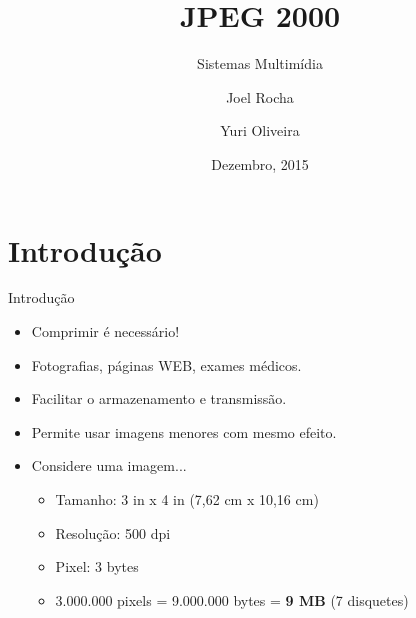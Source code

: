 \documentclass{beamer}
\title{JPEG 2000}
\subtitle{Sistemas Multimídia}
\author[Joel, Yuri]{Joel Rocha \and Yuri Oliveira}
\institute[IFCE]{Instituto Federal de Ciência, Arte e Tecnologia}
\date{Dezembro, 2015}
\begin{document}
  \begin{frame}
    \titlepage
  \end{frame}
  \begin{frame}{\contentsname}
    \tableofcontents
  \end{frame}
  \section{Introdução}
  \begin{frame}{Introdução}
    \begin{itemize}
      \item Comprimir é necessário!
      \item Fotografias, páginas WEB, exames médicos.
      \item Facilitar o armazenamento e transmissão.
      \item Permite usar imagens menores com mesmo efeito.
      \item Considere uma imagem...
      \begin{itemize}
        \item Tamanho: 3 in x 4 in (7,62 cm x 10,16 cm)
        \item Resolução: 500 dpi
        \item Pixel: 3 bytes
        \item 3.000.000 pixels = 9.000.000 bytes = \textbf{9 MB} (7 disquetes)
      \end{itemize}
    \end{itemize}
  \end{frame}
\end{document}
